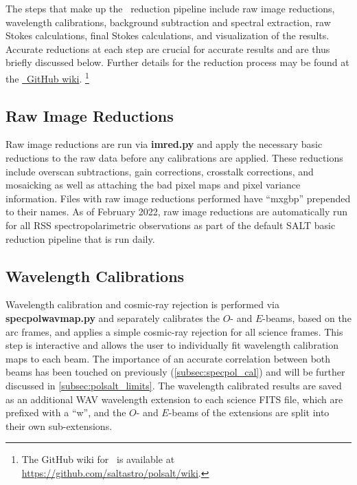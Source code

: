 The steps that make up the \polsalt\ reduction pipeline include raw image reductions, wavelength calibrations, background subtraction and spectral extraction, raw Stokes calculations, final Stokes calculations, and visualization of the results. Accurate reductions at each step are crucial for accurate results and are thus briefly discussed below. Further details for the reduction process may be found at the \href{https://github.com/saltastro/polsalt/wiki}{\polsalt\ GitHub wiki}.%
\footnote{The GitHub wiki for \polsalt\ is available at \url{https://github.com/saltastro/polsalt/wiki}.}

\subsection{Raw Image Reductions} \label{subsec:pol_raw}

Raw image reductions are run via \textbf{imred.py} and apply the necessary basic reductions to the raw data before any calibrations are applied. These reductions include overscan subtractions, gain corrections, crosstalk corrections, and mosaicking as well as attaching the bad pixel maps and pixel variance information. Files with raw image reductions performed have ``mxgbp'' prepended to their names. As of February 2022, raw image reductions are automatically run for all RSS spectropolarimetric observations as part of the default SALT basic reduction pipeline that is run daily.

\subsection{Wavelength Calibrations} \label{subsec:pol_wav}

Wavelength calibration and cosmic-ray rejection is performed via \textbf{specpolwavmap.py} and separately calibrates the $O$- and $E$-beams, based on the arc frames, and applies a simple cosmic-ray rejection for all science frames. This step is interactive and allows the user to individually fit wavelength calibration maps to each beam. The importance of an accurate correlation between both beams has been touched on previously (\autoref{subsec:specpol_cal}) and will be further discussed in \autoref{subsec:polsalt_limits}. The wavelength calibrated results are saved as an additional \gls{WAV} wavelength extension to each science FITS file, which are prefixed with a ``w'', and the $O$- and $E$-beams of the extensions are split into their own sub-extensions.

